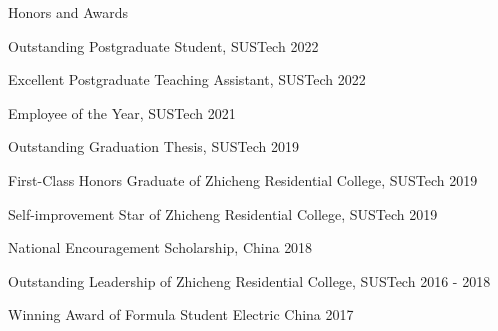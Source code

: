 \documentclass{resume} %
\begin{document}
\begin{rSection}{Honors and Awards}
     \vspace{-8pt}
    \item {Outstanding Postgraduate Student, SUSTech}   \hfill {2022}  
     \vspace{-5pt}
    \item {Excellent Postgraduate Teaching Assistant, SUSTech}   \hfill {2022}  
     \vspace{-5pt}
    \item {Employee of the Year, SUSTech}   \hfill {2021}  
     \vspace{-5pt}
    \item {Outstanding Graduation Thesis, SUSTech}        \hfill {2019}
     \vspace{-5pt}
    \item {First-Class Honors Graduate of Zhicheng Residential College, SUSTech}   \hfill {2019}
     \vspace{-5pt}
    \item {Self-improvement Star of Zhicheng Residential College, SUSTech}   \hfill {2019}
     \vspace{-5pt}
    \item {National Encouragement Scholarship, China}        \hfill {2018}
     \vspace{-5pt}
    \item {Outstanding Leadership of Zhicheng Residential College, SUSTech} \hfill {2016 - 2018}
    \vspace{-5pt}  
     \item {Winning Award of Formula Student Electric China} \hfill {2017}
    \vspace{-5pt}

     


    \end{rSection}
\end{document}
